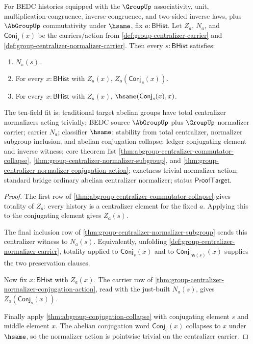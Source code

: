 \begin{theorem}
\label{thm:abgroup-centralizer-normalizer-collapse}
For BEDC histories equipped with the $\GroupUp$ associativity, unit,
multiplication-congruence, inverse-congruence, and two-sided inverse laws, plus
$\AbGroupUp$ commutativity under $\hsame$, fix $a:\mathsf{BHist}$. Let $Z_a$,
$N_a$, and $\mathsf{Conj}_s(x)$ be the carriers/action from
\autoref{def:group-centralizer-carrier} and
\autoref{def:group-centralizer-normalizer-carrier}. Then every
$s:\mathsf{BHist}$ satisfies:
\begin{enumerate}
\item $N_a(s)$.
\item For every $x:\mathsf{BHist}$ with $Z_a(x)$,
$Z_a(\mathsf{Conj}_s(x))$.
\item For every $x:\mathsf{BHist}$ with $Z_a(x)$,
$\hsame(\mathsf{Conj}_s(x),x)$.
\end{enumerate}
The ten-field fit is: traditional target abelian groups have total centralizer
normalizers acting trivially; BEDC source $\AbGroupUp$ plus $\GroupUp$
normalizer carrier; carrier $N_a$; classifier $\hsame$; stability from total
centralizer, normalizer subgroup inclusion, and abelian conjugation collapse;
ledger conjugating element and inverse witness; core theorem list
\autoref{thm:abgroup-centralizer-commutator-collapse},
\autoref{thm:group-centralizer-normalizer-subgroup}, and
\autoref{thm:group-centralizer-normalizer-conjugation-action}; exactness
trivial normalizer action; standard bridge ordinary abelian centralizer
normalizer; status $\mathsf{ProofTarget}$.
\end{theorem}
\begin{proof}
The first row of
\autoref{thm:abgroup-centralizer-commutator-collapse} gives totality of
$Z_a$: every history is a centralizer element for the fixed $a$. Applying this
to the conjugating element gives $Z_a(s)$.

The final inclusion row of
\autoref{thm:group-centralizer-normalizer-subgroup} sends this centralizer
witness to $N_a(s)$. Equivalently, unfolding
\autoref{def:group-centralizer-normalizer-carrier}, totality applied to
$\mathsf{Conj}_s(x)$ and to
$\mathsf{Conj}_{\mathsf{inv}(s)}(x)$ supplies the two preservation clauses.

Now fix $x:\mathsf{BHist}$ with $Z_a(x)$. The carrier row of
\autoref{thm:group-centralizer-normalizer-conjugation-action}, read with the
just-built $N_a(s)$, gives $Z_a(\mathsf{Conj}_s(x))$.

Finally apply \autoref{thm:abgroup-conjugation-collapse} with conjugating
element $s$ and middle element $x$. The abelian conjugation word
$\mathsf{Conj}_s(x)$ collapses to $x$ under $\hsame$, so the normalizer action
is pointwise trivial on the centralizer carrier.
\end{proof}

